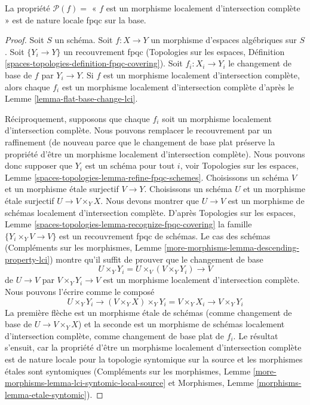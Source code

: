 \begin{lemma}
\label{lemma-descending-property-lci}
La propriété $\mathcal{P}(f) =$ « $f$ est un morphisme localement
d'intersection complète » est de nature locale fpqc sur la base.
\end{lemma}

\begin{proof}
Soit $S$ un schéma. Soit $f : X \to Y$ un
morphisme d'espaces algébriques sur $S$.
Soit $\{Y_i \to Y\}$ un recouvrement fpqc
(Topologies sur les espaces, Définition
\ref{spaces-topologies-definition-fpqc-covering}).
Soit $f_i : X_i \to Y_i$ le changement de base de $f$ par $Y_i \to Y$.
Si $f$ est un morphisme localement d'intersection complète,
alors chaque $f_i$ est un morphisme localement d'intersection complète
d'après le Lemme \ref{lemma-flat-base-change-lci}.

\medskip\noindent
Réciproquement, supposons que chaque $f_i$ soit un morphisme localement d'intersection complète.
Nous pouvons remplacer le recouvrement par un raffinement (de nouveau parce que le
changement de base plat préserve la propriété d'être un
morphisme localement d'intersection complète). Nous pouvons donc supposer que
$Y_i$ est un schéma pour tout $i$, voir
Topologies sur les espaces, Lemme \ref{spaces-topologies-lemma-refine-fpqc-schemes}.
Choisissons un schéma $V$ et un morphisme étale surjectif $V \to Y$.
Choisissons un schéma $U$ et un morphisme étale surjectif
$U \to V \times_Y X$. Nous devons montrer que $U \to V$ est un
morphisme de schémas localement d'intersection complète.
D'après Topologies sur les espaces, Lemme
\ref{spaces-topologies-lemma-recognize-fpqc-covering}
la famille $\{Y_i \times_Y V \to V\}$ est un recouvrement fpqc
de schémas. Le cas des schémas
(Compléments sur les morphismes, Lemme \ref{more-morphisms-lemma-descending-property-lci})
montre qu'il suffit de prouver que le changement de base
$$
U \times_Y Y_i = U \times_V (V \times_Y Y_i) \longrightarrow V
$$
de $U \to V$ par $V \times_Y Y_i \to V$ est un
morphisme localement d'intersection complète. Nous pouvons l'écrire comme le
composé
$$
U \times_Y Y_i \longrightarrow
(V \times_Y X) \times_Y Y_i = V \times_Y X_i \longrightarrow
V \times_Y Y_i
$$
La première flèche est un morphisme étale de schémas (comme changement de base de
$U \to V \times_Y X$) et la seconde est un
morphisme de schémas localement d'intersection complète, comme changement de base plat de $f_i$.
Le résultat s'ensuit, car la propriété d'être un morphisme localement d'intersection complète
est de nature locale pour la topologie syntomique sur la source et les morphismes étales
sont syntomiques (Compléments sur les morphismes, Lemme
\ref{more-morphisms-lemma-lci-syntomic-local-source}
et Morphismes, Lemme \ref{morphisms-lemma-etale-syntomic}).
\end{proof}

